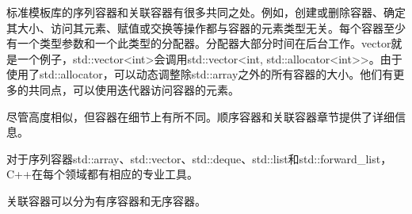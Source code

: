 

标准模板库的序列容器和关联容器有很多共同之处。例如，创建或删除容器、确定其大小、访问其元素、赋值或交换等操作都与容器的元素类型无关。每个容器至少有一个类型参数和一个此类型的分配器。分配器大部分时间在后台工作。vector就是一个例子，std::vector<int>会调用std::vector<int, std::allocator<int>{}>。由于使用了std::allocator，可以动态调整除std::array之外的所有容器的大小。他们有更多的共同点，可以使用迭代器访问容器的元素。

尽管高度相似，但容器在细节上有所不同。顺序容器和关联容器章节提供了详细信息。

对于序列容器std::array、std::vector、std::deque、std::list和std::forward\_list，C++在每个领域都有相应的专业工具。

关联容器可以分为有序容器和无序容器。


















